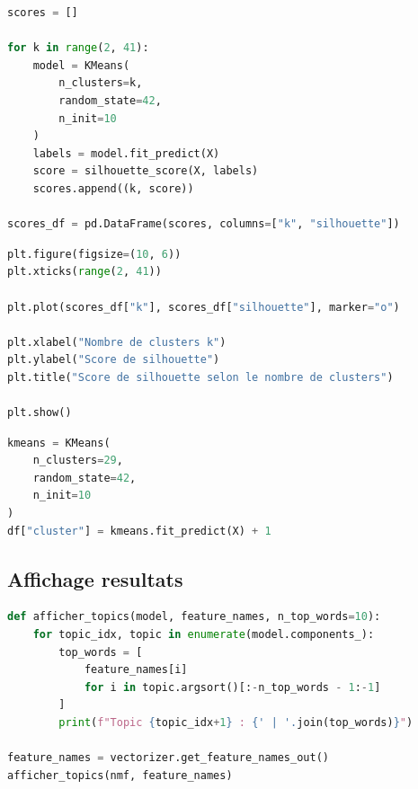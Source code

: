 \begin{lstlisting}[language=Python, caption={Évaluation du nombre de clusters par score de silhouette}]
scores = []

for k in range(2, 41):
    model = KMeans(
        n_clusters=k,
        random_state=42,
        n_init=10
    )
    labels = model.fit_predict(X)
    score = silhouette_score(X, labels)
    scores.append((k, score))

scores_df = pd.DataFrame(scores, columns=["k", "silhouette"])
\end{lstlisting}


\begin{lstlisting}[language=Python, caption={Visualisation du score de silhouette selon le nombre de clusters}]
plt.figure(figsize=(10, 6))
plt.xticks(range(2, 41))

plt.plot(scores_df["k"], scores_df["silhouette"], marker="o")

plt.xlabel("Nombre de clusters k")
plt.ylabel("Score de silhouette")
plt.title("Score de silhouette selon le nombre de clusters")

plt.show()
\end{lstlisting}

\begin{lstlisting}[language=Python, caption={Entraînement du modèle K-means final}]
kmeans = KMeans(
    n_clusters=29,
    random_state=42,
    n_init=10
)
df["cluster"] = kmeans.fit_predict(X) + 1
\end{lstlisting}

\subsection{Affichage resultats}
\begin{lstlisting}[language=Python, caption={Affichage des mots les plus importants par topic}]
def afficher_topics(model, feature_names, n_top_words=10):
    for topic_idx, topic in enumerate(model.components_):
        top_words = [
            feature_names[i]
            for i in topic.argsort()[:-n_top_words - 1:-1]
        ]
        print(f"Topic {topic_idx+1} : {' | '.join(top_words)}")

feature_names = vectorizer.get_feature_names_out()
afficher_topics(nmf, feature_names)
\end{lstlisting}

